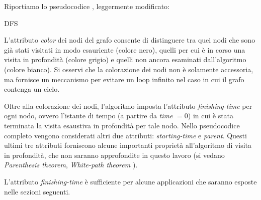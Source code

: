 Riportiamo lo pseudocodice \cite{clrs}, leggermente modificato:\\
\begin{algorithm}[H]
    \label{alg:dfs}
    \caption{DFS}
    \SetAlgoLined
\end{algorithm}
L'attributo \emph{color} dei nodi del grafo consente di distinguere tra quei nodi che sono già stati visitati in modo esauriente (colore nero), quelli per cui è in corso una visita in profondità (colore grigio) e quelli non ancora esaminati dall'algoritmo (colore bianco). Si osservi che la colorazione dei nodi non è solamente accessoria, ma fornisce un meccanismo per evitare un loop infinito nel caso in cui il grafo contenga un ciclo.

Oltre alla colorazione dei nodi, l'algoritmo imposta l'attributo \emph{finishing-time} per ogni nodo, ovvero l'istante di tempo (a partire da \emph{time} $= 0$) in cui è stata terminata la visita esaustiva in profondità per tale nodo. Nello pseudocodice completo vengono considerati altri due attributi: \emph{starting-time} e \emph{parent}. Questi ultimi tre attributi forniscono alcune importanti proprietà all'algoritmo di visita in profondità, che non saranno approfondite in questo lavoro (si vedano \emph{Parenthesis theorem}, \emph{White-path theorem} \cite{clrs}).

L'attributo \emph{finishing-time} è sufficiente per alcune applicazioni che saranno esposte nelle sezioni seguenti.
